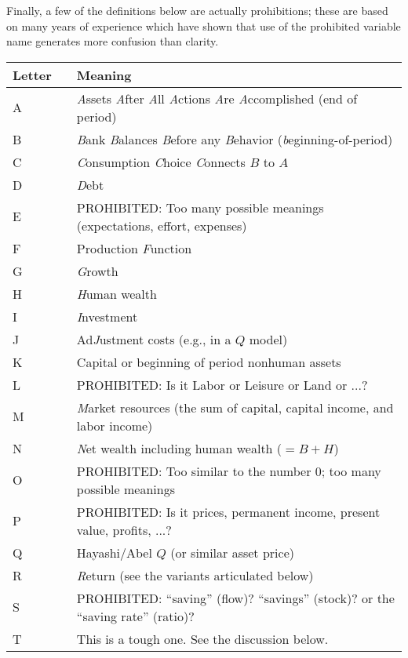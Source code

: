 \documentclass{econark}
\begin{document}
Finally, a few of the definitions below are actually prohibitions; these are based on many years of experience which have shown that use of the prohibited variable name generates more confusion than clarity.

\hypertarget{RomanLetters}{}
\begin{table}[ht]
  \centering
  \begin{tabular}{|lcl|}   \hline
    Letter & & Meaning
    \\ \hline
    A & & \textit{A}ssets \textit{A}fter \textit{A}ll \textit{A}ctions \textit{A}re \textit{A}ccomplished (end of period)\\
    B & & \textit{B}ank \textit{B}alances \textit{B}efore any \textit{B}ehavior (\textit{b}eginning-of-period)\\
    C & & \textit{C}onsumption \textit{C}hoice \textit{C}onnects $B$ to $A$\\
    D & & \textit{D}ebt\\
    E & & PROHIBITED:  Too many possible meanings (expectations, effort, expenses)\\
    F & & Production \textit{F}unction\\
    G & & \textit{G}rowth\\
    H & & \textit{H}uman wealth\\
    I & & \textit{I}nvestment\\
    J & & Ad\textit{J}ustment costs (e.g., in a $Q$ model)\\
    K & & Capital or beginning of period nonhuman assets\\
    L & & PROHIBITED: Is it Labor or Leisure or Land or ...?\\
    M & & \textit{M}arket resources (the sum of capital, capital income, and labor income)\\
    N & & \textit{N}et wealth including human wealth ($=B + H$)\\
    O & & PROHIBITED: Too similar to the number 0; too many possible meanings\\
    P & & PROHIBITED: Is it prices, permanent income, present value, profits, ...?\\
    Q & & Hayashi/Abel $Q$ (or similar asset price)\\
    R & & \textit{R}eturn (see the variants articulated below)\\
    S & & PROHIBITED: ``saving'' (flow)? ``savings'' (stock)? or the ``saving rate'' (ratio)?\\
    T & & This is a tough one.  See the discussion below.\\

\end{tabular}
\end{table}
\end{document}
